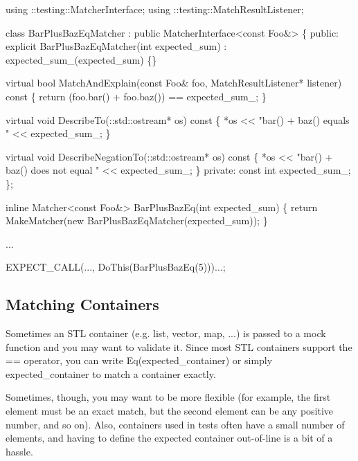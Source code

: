 \begin{DoxyCode}
using ::testing::MatcherInterface;
using ::testing::MatchResultListener;

\textcolor{keyword}{class }BarPlusBazEqMatcher : \textcolor{keyword}{public} MatcherInterface<const Foo&> \{
 \textcolor{keyword}{public}:
  \textcolor{keyword}{explicit} BarPlusBazEqMatcher(\textcolor{keywordtype}{int} expected\_sum)
      : expected\_sum\_(expected\_sum) \{\}

  \textcolor{keyword}{virtual} \textcolor{keywordtype}{bool} MatchAndExplain(\textcolor{keyword}{const} Foo& foo,
                               MatchResultListener* listener)\textcolor{keyword}{ const }\{
    \textcolor{keywordflow}{return} (foo.bar() + foo.baz()) == expected\_sum\_;
  \}

  \textcolor{keyword}{virtual} \textcolor{keywordtype}{void} DescribeTo(::std::ostream* os)\textcolor{keyword}{ const }\{
    *os << \textcolor{stringliteral}{"bar() + baz() equals "} << expected\_sum\_;
  \}

  \textcolor{keyword}{virtual} \textcolor{keywordtype}{void} DescribeNegationTo(::std::ostream* os)\textcolor{keyword}{ const }\{
    *os << \textcolor{stringliteral}{"bar() + baz() does not equal "} << expected\_sum\_;
  \}
 \textcolor{keyword}{private}:
  \textcolor{keyword}{const} \textcolor{keywordtype}{int} expected\_sum\_;
\};

\textcolor{keyword}{inline} Matcher<const Foo&> BarPlusBazEq(\textcolor{keywordtype}{int} expected\_sum) \{
  \textcolor{keywordflow}{return} MakeMatcher(\textcolor{keyword}{new} BarPlusBazEqMatcher(expected\_sum));
\}

...

  EXPECT\_CALL(..., DoThis(BarPlusBazEq(5)))...;
\end{DoxyCode}


\subsection*{Matching Containers}

Sometimes an S\+TL container (e.\+g. list, vector, map, ...) is passed to a mock function and you may want to validate it. Since most S\+TL containers support the {\ttfamily ==} operator, you can write {\ttfamily Eq(expected\+\_\+container)} or simply {\ttfamily expected\+\_\+container} to match a container exactly.

Sometimes, though, you may want to be more flexible (for example, the first element must be an exact match, but the second element can be any positive number, and so on). Also, containers used in tests often have a small number of elements, and having to define the expected container out-\/of-\/line is a bit of a hassle.

